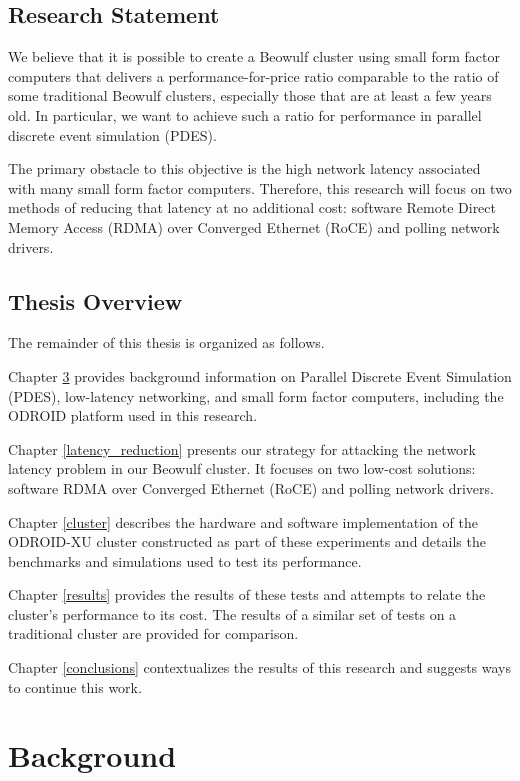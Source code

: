 \documentclass[11pt]{book}
\begin{document}
\section{\textbf{Research Statement}}

We believe that it is possible to create a Beowulf cluster using small form
factor computers that delivers a performance-for-price ratio comparable to the
ratio of some traditional Beowulf clusters, especially those that are at least a few
years old. In particular, we want to achieve such a ratio for performance in
parallel discrete event simulation (PDES).

The primary obstacle to this objective is the high network latency associated
with many small form factor computers. Therefore, this research will focus on
two methods of reducing that latency at no additional cost: software Remote
Direct Memory Access (RDMA) over Converged Ethernet (RoCE) and polling network
drivers.

\section{\textbf{Thesis Overview}}

The remainder of this thesis is organized as follows.

Chapter \ref{background} provides background information on Parallel Discrete
Event Simulation (PDES), low-latency networking, and small form factor
computers, including the ODROID platform used in this research.

Chapter \ref{latency_reduction} presents our strategy for attacking the network
latency problem in our Beowulf cluster. It focuses on two low-cost solutions:
software RDMA over Converged Ethernet (RoCE) and polling network drivers.

Chapter \ref{cluster} describes the hardware and software implementation of the
ODROID-XU cluster constructed as part of these experiments and details the
benchmarks and simulations used to test its performance.

Chapter \ref{results} provides the results of these tests and attempts to relate
the cluster's performance to its cost. The results of a similar set of tests on
a traditional cluster are provided for comparison.

Chapter \ref{conclusions} contextualizes the results of this research and
suggests ways to continue this work.

\newpage
\chapter{Background}
\label{background}
\end{document}
